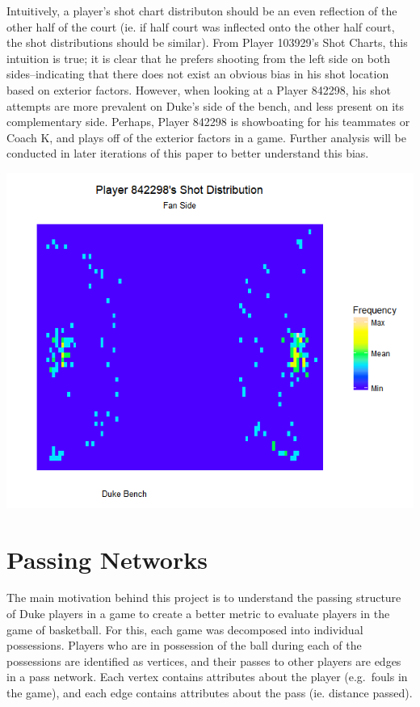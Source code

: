 \documentclass[12pt,twoside]{dukestatscithesis}
\theoremstyle{definition}
\theoremstyle{definition}
\theoremstyle{definition}
\theoremstyle{remark}
\begin{document}
Intuitively, a player's shot chart distributon should be an even
reflection of the other half of the court (ie. if half court was
inflected onto the other half court, the shot distributions should be
similar). From Player 103929's Shot Charts, this intuition is true; it
is clear that he prefers shooting from the left side on both
sides--indicating that there does not exist an obvious bias in his shot
location based on exterior factors. However, when looking at a Player
842298, his shot attempts are more prevalent on Duke's side of the
bench, and less present on its complementary side. Perhaps, Player
842298 is showboating for his teammates or Coach K, and plays off of the
exterior factors in a game. Further analysis will be conducted in later
iterations of this paper to better understand this bias.

\includegraphics{img/shotdistribution.png}

\chapter{Passing Networks}\label{passing-networks}

The main motivation behind this project is to understand the passing
structure of Duke players in a game to create a better metric to
evaluate players in the game of basketball. For this, each game was
decomposed into individual possessions. Players who are in possession of
the ball during each of the possessions are identified as vertices, and
their passes to other players are edges in a pass network. Each vertex
contains attributes about the player (e.g.~fouls in the game), and each
edge contains attributes about the pass (ie. distance passed).
\end{document}
